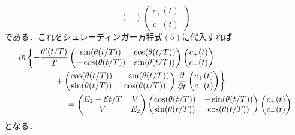 \documentclass[a4paper,pdflatex,ja=standard]{bxjsarticle}
\begin{document}
\begin{enumerate}
\begin{enumerate}
\begin{equation}
\begin{pmatrix}
      \end{pmatrix}
      \begin{pmatrix}
        c_{+}(t) \\
        c_{-}(t)
      \end{pmatrix}
    \end{equation}
    である．これをシュレーディンガー方程式$(5)$に代入すれば
    \begin{align}
      &i\hbar
      \left\{  
        -\frac{\theta^{\prime}(t/T)}{T}
        \begin{pmatrix}
          \sin(\theta(t/T)) & \cos(\theta(t/T)) \\
          -\cos(\theta(t/T)) & \sin(\theta(t/T))
        \end{pmatrix}
        \begin{pmatrix}
          c_{+}(t) \\
          c_{-}(t)
        \end{pmatrix}
      \right.
      \nonumber
      \\
      &\hspace{1.5cm}\left.
        +
        \begin{pmatrix}
          \cos(\theta(t/T)) & -\sin(\theta(t/T)) \\
          \sin(\theta(t/T)) & \cos(\theta(t/T))
        \end{pmatrix}
        \pdv{}{t}
        \begin{pmatrix}
          c_{+}(t) \\
          c_{-}(t)
        \end{pmatrix}
      \right\}
      \nonumber
      \\
      &\hspace{2cm}
      =
      \begin{pmatrix}
        E_{2}-\mathcal{E}t/T & V \\
        V & E_{2}
      \end{pmatrix}
      \begin{pmatrix}
        \cos(\theta(t/T)) & -\sin(\theta(t/T)) \\
        \sin(\theta(t/T)) & \cos(\theta(t/T))
      \end{pmatrix}
      \begin{pmatrix}
        c_{+}(t) \\
        c_{-}(t)
      \end{pmatrix}
      \label{shr1}
    \end{align}
    となる．


\end{enumerate}
\end{enumerate}
\end{document}
